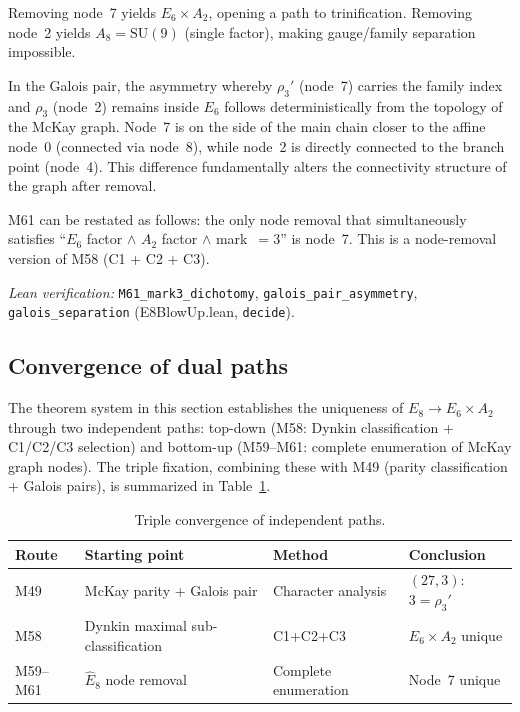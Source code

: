 \documentclass[sn-mathphys-num,Numbered]{sn-jnl}
\theoremstyle{thmstyleone}
\theoremstyle{thmstylethree}
\newcommand{\SU}{\mathrm{SU}}
\newcommand{\Ehat}{\hat{E}}
\begin{document}
Removing node~7 yields $E_6 \times A_2$, opening a path to trinification.
Removing node~2 yields $A_8 = \SU(9)$ (single factor), making gauge/family
separation impossible.

In the Galois pair, the asymmetry whereby $\rho_3'$ (node~7) carries the
family index and $\rho_3$ (node~2) remains inside $E_6$ follows
deterministically from the topology of the McKay graph.  Node~7 is on the side
of the main chain closer to the affine node~0 (connected via node~8), while
node~2 is directly connected to the branch point (node~4).  This difference
fundamentally alters the connectivity structure of the graph after removal.

M61 can be restated as follows: the only node removal that simultaneously
satisfies ``$E_6$ factor $\wedge$ $A_2$ factor $\wedge$ mark~$= 3$'' is
node~7.  This is a node-removal version of M58 (C1 + C2 + C3).

\noindent\textit{Lean verification:}
\texttt{M61\_mark3\_dichotomy}, \texttt{galois\_pair\_asymmetry},
\texttt{galois\_separation} (E8BlowUp.lean, \texttt{decide}).


\subsection{Convergence of dual paths}\label{sec:convergence}

The theorem system in this section establishes the uniqueness of $E_8 \to E_6
\times A_2$ through two independent paths: top-down (M58: Dynkin
classification + C1/C2/C3 selection) and bottom-up (M59--M61: complete
enumeration of McKay graph nodes).  The triple fixation, combining these with
M49 (parity classification + Galois pairs), is summarized in
Table~\ref{tab:triple}.

\begin{table}[htb]
\centering
\caption{Triple convergence of independent paths.}\label{tab:triple}
\begin{tabular}{llll}
\toprule
Route & Starting point & Method & Conclusion \\
\midrule
M49 & McKay parity + Galois pair & Character analysis & $(27,3)$:
  $3 = \rho_3'$ \\
M58 & Dynkin maximal sub-classification & C1+C2+C3 & $E_6 \times A_2$ unique \\
M59--M61 & $\Ehat_8$ node removal & Complete enumeration & Node~7 unique \\
\bottomrule
\end{tabular}
\end{table}
\end{document}
